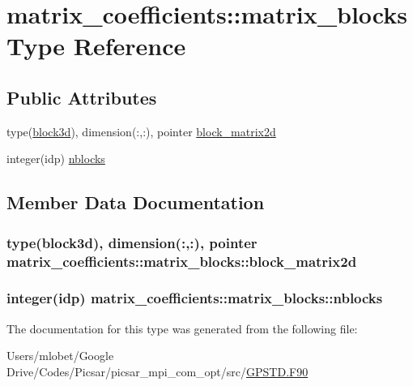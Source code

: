 \hypertarget{structmatrix__coefficients_1_1matrix__blocks}{}\section{matrix\+\_\+coefficients\+:\+:matrix\+\_\+blocks Type Reference}
\label{structmatrix__coefficients_1_1matrix__blocks}
\subsection*{Public Attributes}
\begin{DoxyCompactItemize}
\item 
type(\hyperlink{structmatrix__coefficients_1_1block3d}{block3d}), dimension(\+:,\+:), pointer \hyperlink{structmatrix__coefficients_1_1matrix__blocks_a993778845db7b089e6f8fb91b33b6696}{block\+\_\+matrix2d}
\item 
integer(idp) \hyperlink{structmatrix__coefficients_1_1matrix__blocks_aed438c2a5c51dc536bd03319bd12df9f}{nblocks}
\end{DoxyCompactItemize}


\subsection{Member Data Documentation}
\subsubsection[{\texorpdfstring{block\+\_\+matrix2d}{block_matrix2d}}]{\setlength{\rightskip}{0pt plus 5cm}type({\bf block3d}), dimension(\+:,\+:), pointer matrix\+\_\+coefficients\+::matrix\+\_\+blocks\+::block\+\_\+matrix2d}\hypertarget{structmatrix__coefficients_1_1matrix__blocks_a993778845db7b089e6f8fb91b33b6696}{}\label{structmatrix__coefficients_1_1matrix__blocks_a993778845db7b089e6f8fb91b33b6696}
\subsubsection[{\texorpdfstring{nblocks}{nblocks}}]{\setlength{\rightskip}{0pt plus 5cm}integer(idp) matrix\+\_\+coefficients\+::matrix\+\_\+blocks\+::nblocks}\hypertarget{structmatrix__coefficients_1_1matrix__blocks_aed438c2a5c51dc536bd03319bd12df9f}{}\label{structmatrix__coefficients_1_1matrix__blocks_aed438c2a5c51dc536bd03319bd12df9f}


The documentation for this type was generated from the following file\+:\begin{DoxyCompactItemize}
\item 
Users/mlobet/\+Google Drive/\+Codes/\+Picsar/picsar\+\_\+mpi\+\_\+com\+\_\+opt/src/\hyperlink{_g_p_s_t_d_8_f90}{G\+P\+S\+T\+D.\+F90}\end{DoxyCompactItemize}
